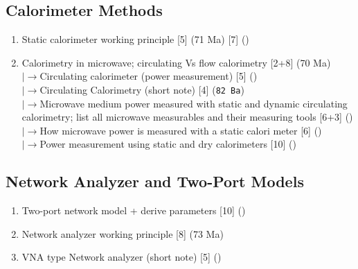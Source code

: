 \documentclass[12pt]{article}
\newcommand{\lb}{\\$\left|\rightarrow\right.$}
\begin{document}
  \subsection{Calorimeter Methods}
    \begin{enumerate}[topsep=0pt, noitemsep]
      \item Static calorimeter working principle \hfill [5] (71 Ma) [7] ()
      \item Calorimetry in microwave; circulating Vs flow calorimetry \hfill [2+8] (70 Ma)
        \lb Circulating calorimeter (power measurement) \hfill [5] ()
        \lb Circulating Calorimetry (short note) \hfill [4] (\texttt{82 Ba})
        \lb Microwave medium power measured with static and dynamic circulating calorimetry; list all microwave measurables and their measuring tools \hfill [6+3] ()
        \lb How microwave power is measured with a static calori meter \hfill [6] ()
        \lb Power measurement using static and dry calorimeters \hfill [10] ()
    \end{enumerate}

  \subsection{Network Analyzer and Two-Port Models}
    \begin{enumerate}[topsep=0pt, noitemsep]
      \item Two-port network model + derive parameters \hfill [10] ()
      \item Network analyzer working principle \hfill [8] (73 Ma)
      \item VNA type Network analyzer (short note) \hfill [5] ()
    \end{enumerate}
\end{document}
